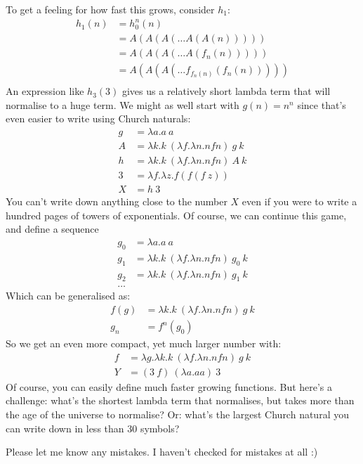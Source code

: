 \documentclass[a4paper, 11pt]{article}
\theoremstyle{definition}
\begin{document}
To get a feeling for how fast this grows, consider $h_1$:
\begin{align*}
  h_1(n) &= h_0^n(n)\\
         &= A(A(A(\dots A(A(n)))))\\
         &= A(A(A(\dots A(f_n(n)))))\\
         &= A(A(A(\dots f_{f_n(n)}(f_n(n)))))\\
\end{align*}
An expression like $h_3(3)$ gives us a relatively short lambda term that will normalise to a huge term. We might as well start with $g(n) = n^n$ since that's even easier to write using Church naturals:
\begin{align*}
  g &= \lambda a. a\ a\\
  A &= \lambda k. k\ (\lambda f. \lambda n. n f n)\ g\ k\\
  h &= \lambda k. k\ (\lambda f. \lambda n. n f n)\ A\ k\\
  3 &= \lambda f. \lambda z. f (f (f\ z))\\
  X &= h\ 3
\end{align*}
You can't write down anything close to the number $X$ even if you were to write a hundred pages of towers of exponentials. Of course, we can continue this game, and define a sequence
\begin{align*}
  g_0 &= \lambda a. a\ a\\
  g_1 &= \lambda k. k\ (\lambda f. \lambda n. n f n)\ g_0\ k\\
  g_2 &= \lambda k. k\ (\lambda f. \lambda n. n f n)\ g_1\ k\\
  \dots
\end{align*}
Which can be generalised as:
\begin{align*}
  f(g) &= \lambda k. k\ (\lambda f. \lambda n. n f n)\ g\ k\\
  g_n &= f^n(g_0)
\end{align*}
So we get an even more compact, yet much larger number with:
\begin{align*}
  f &= \lambda g. \lambda k. k\ (\lambda f. \lambda n. n f n)\ g\ k\\
  Y &= (3\ f)\ (\lambda a. a a)\ 3
\end{align*}
Of course, you can easily define much faster growing functions. But here's a challenge: what's the shortest lambda term that normalises, but takes more than the age of the universe to normalise? Or: what's the largest Church natural you can write down in less than 30 symbols?

Please let me know any mistakes. I haven't checked for mistakes at all :)
\end{document}
